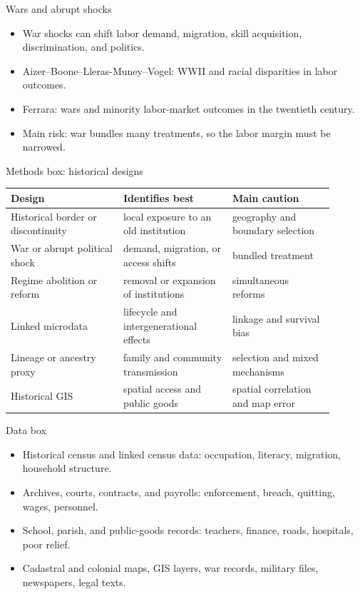 \documentclass[aspectratio=169,11pt]{beamer}
\begin{document}
\begin{frame}{Wars and abrupt shocks}
\begin{itemize}
    \item War shocks can shift labor demand, migration, skill acquisition, discrimination, and politics.
    \item Aizer--Boone--Lleras-Muney--Vogel: WWII and racial disparities in labor outcomes.
    \item Ferrara: wars and minority labor-market outcomes in the twentieth century.
    \item Main risk: war bundles many treatments, so the labor margin must be narrowed.
\end{itemize}
\end{frame}

\begin{frame}{Methods box: historical designs}
\small
\begin{tabular}{p{0.31\linewidth} p{0.30\linewidth} p{0.29\linewidth}}
\toprule
Design & Identifies best & Main caution \\
\midrule
Historical border or discontinuity & local exposure to an old institution & geography and boundary selection \\
War or abrupt political shock & demand, migration, or access shifts & bundled treatment \\
Regime abolition or reform & removal or expansion of institutions & simultaneous reforms \\
Linked microdata & lifecycle and intergenerational effects & linkage and survival bias \\
Lineage or ancestry proxy & family and community transmission & selection and mixed mechanisms \\
Historical GIS & spatial access and public goods & spatial correlation and map error \\
\bottomrule
\end{tabular}
\end{frame}

\begin{frame}{Data box}
\begin{itemize}
    \item Historical census and linked census data: occupation, literacy, migration, household structure.
    \item Archives, courts, contracts, and payrolls: enforcement, breach, quitting, wages, personnel.
    \item School, parish, and public-goods records: teachers, finance, roads, hospitals, poor relief.
    \item Cadastral and colonial maps, GIS layers, war records, military files, newspapers, legal texts.
\end{itemize}
\end{frame}
\end{document}
